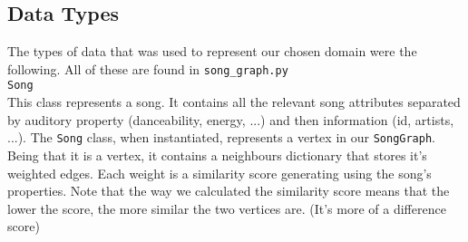\documentclass[fontsize=11pt]{article}
\begin{document}
    \begin{comment}
        A computational overview for your project.

        This is similar to the computational plan you submitted in the proposal, except now it’s not a plan, but a description of the program you’re actually submitting.

        \begin{itemize}
            \item Describe the kinds of data your project uses to represent your chosen domain, and how trees and/or graphs play a central role in this data representation.
            \item Describe the major the computations your program performs, such as: building trees/graphs from a dataset or computation, data transformation/filtering/aggregation, computational models, and/or algorithms.
            \item Explain how your program reports the results of your computation in a visual and/or interactive way.
            \item Explain how your program uses new libraries to accomplish its tasks. Refer to specific functions, data types, and/or capabilities of the library that make it relevant for accomplishing these tasks.
        \end{itemize}

        This overview should be more detailed and concrete than the plan you submitted, since you are submitting your actual code as well. Refer to concrete files, data types, and/or functions that you created in your descriptions of this part. However, you do not need to mention every single data type/function you wrote; use your judgment to only refer to the most important data types and functions that you created for each “computational phase” of your program.
    \end{comment}

    \subsection*{Data Types}
    The types of data that was used to represent our chosen domain were the following. All of these are found in \texttt{song\_graph.py}\\
    \noindent \texttt{Song} \\
    This class represents a song. It contains all the relevant song attributes separated by auditory property (danceability, energy, ...) and then information (id, artists, ...). The \texttt{Song} class, when instantiated, represents a vertex in our \texttt{SongGraph}. Being that it is a vertex, it contains a neighbours dictionary that stores it's weighted edges. Each weight is a similarity score generating using the song's properties. Note that the way we calculated the similarity score means that the lower the score, the more similar the two vertices are. (It's more of a difference score)\\ \noindent
\end{document}
